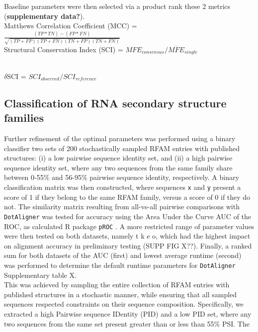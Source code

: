 \documentclass{bmcart}
\newcommand\dotaligner{\texttt{DotAligner}}
\begin{document}
Baseline parameters were then selected via a product rank these 2 metrics 
(\textbf{supplementary data?}).\\

Matthews Correlation Coefficient (MCC) = $\frac{(TP * TN) - (FP * FN)}{ \sqrt{ (TP + FP)(TP + FN)(TN + FP)(TN + FN) }}$\\

Structural Conservation Index (SCI) = $ MFE_{consensus}  / \overline{MFE}_{single}  $\\\

$\delta$SCI = $SCI_{observed} / SCI_{reference}$

\subsection*{Classification of RNA secondary structure families}

Further refinement of the optimal parameters was performed using a binary classifier two sets of 
200 stochastically sampled RFAM entries with published structures: 
(i) a low pairwise sequence identity set, and (ii) a high pairwise sequence identity set, 
where any two sequences from the same family share between 0-55\% and 56-95\% pairwise sequence identity, respectively. A binary classification matrix was then constructed, where sequences \texttt{x} and \texttt{y}
present a score of 1 if they belong to the same RFAM family, versus a score of 0 if they do not. 
The similarity matrix resulting from all-vs-all pairwise comparisons with \dotaligner{} was tested for 
accuracy using the Area Under the Curve AUC of the ROC, as calculated R package \texttt{pROC} \cite{robin2011proc}. 
A more restricted range of parameter values were then tested on both datasets, {\color{red} namely t k e o, which had the highest impact on alignment accuracy in preliminary testing (SUPP FIG X??)}. Finally, a ranked sum for both datasets of the AUC (first) and lowest average runtime (second) was performed to determine the default runtime parameters for \dotaligner{} {\color{red} Supplementary table X}. \\


This was achieved by sampling the entire collection of RFAM entries with published structures 
in a stochastic manner, while ensuring that all sampled sequences respected constraints 
on their sequence composition. Specifically, we extracted a high Pairwise sequence IDentity (PID) 
and a low PID set, where any two sequences from the same set present greater than or less than 
55\% PSI. The 
\end{document}
